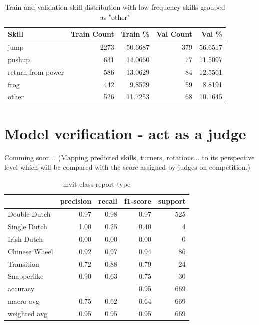 \begin{table}[h!]
    \centering
    \begin{tabular}{|l|r|r|r|r|}
        \hline
        \textbf{Skill} & \textbf{Train Count} & \textbf{Train \%} & \textbf{Val Count} & \textbf{Val \%} \\
        \hline
        jump & 2273 & 50.6687 & 379 & 56.6517 \\
        pushup & 631 & 14.0660 & 77 & 11.5097 \\
        return from power & 586 & 13.0629 & 84 & 12.5561 \\
        frog & 442 & 9.8529 & 59 & 8.8191 \\
        other & 526 & 11.7253 & 68 & 10.1645 \\
        \hline
    \end{tabular}
    \caption[Skill distribution skills limited classes]{Train and validation skill distribution with low-frequency skills grouped as "other"}
    \label{tab:skill_distribution_grouped_final}
\end{table}


\section{Model verification - act as a judge}

Comming soon... (Mapping predicted skills, turners, rotations... to its perspective level which will be compared with the score assigned by judges on competition.)

\begin{table}[h!]
    \begin{tabular}{|l|r|r|r|r|}
        \hline          & precision & recall & f1-score & support \\
        \hline
        Double Dutch    &   0.97    &   0.98    &   0.97    &  525 \\
        Single Dutch    &   1.00    &   0.25    &   0.40    &  4   \\
        Irish Dutch     &   0.00    &   0.00    &   0.00    &  0   \\
        Chinese Wheel   &   0.92    &   0.97    &   0.94    &  86  \\
        Transition      &   0.72    &   0.88    &   0.79    &  24  \\
        Snapperlike     &   0.90    &   0.63    &   0.75    &  30  \\
        \hline
        accuracy        &           &           &   0.95    &  669 \\
        macro avg       &   0.75    &   0.62    &   0.64    &  669 \\
        weighted avg    &   0.95    &   0.95    &   0.95    &  669 \\ \hline
    \end{tabular}
    \caption[Type distribution]{mvit-class-report-type}
    \label{tbl:mvit-class-report-type}
\end{table}

